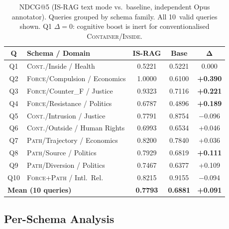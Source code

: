 \documentclass[11pt,a4paper]{article}
\begin{document}
\begin{table}[h]
\centering
\small
\setlength{\tabcolsep}{4pt}
\begin{tabular}{clccc}
\toprule
\textbf{Q} & \textbf{Schema / Domain} & \textbf{IS-RAG} & \textbf{Base} & $\boldsymbol{\Delta}$ \\
\midrule
Q1  & \textsc{Cont.}/Inside / Health           & 0.5221 & 0.5221 & 0.000 \\
Q2  & \textsc{Force}/Compulsion / Economics    & 1.0000 & 0.6100 & \textbf{+0.390} \\
Q3  & \textsc{Force}/Counter\_F / Justice      & 0.9323 & 0.7116 & \textbf{+0.221} \\
Q4  & \textsc{Force}/Resistance / Politics     & 0.6787 & 0.4896 & \textbf{+0.189} \\
\midrule
Q5  & \textsc{Cont.}/Intrusion / Justice       & 0.7791 & 0.8754 & $-$0.096 \\
Q6  & \textsc{Cont.}/Outside / Human Rights    & 0.6993 & 0.6534 & +0.046 \\
\midrule
Q7  & \textsc{Path}/Trajectory / Economics     & 0.8200 & 0.7840 & +0.036 \\
Q8  & \textsc{Path}/Source / Politics          & 0.7929 & 0.6819 & \textbf{+0.111} \\
Q9  & \textsc{Path}/Diversion / Politics       & 0.7467 & 0.6377 & +0.109 \\
\midrule
Q10 & \textsc{Force+Path} / Intl.\ Rel.        & 0.8215 & 0.9155 & $-$0.094 \\
\midrule
\multicolumn{2}{l}{\textbf{Mean (10 queries)}} & \textbf{0.7793} & \textbf{0.6881} & \textbf{+0.091} \\
\bottomrule
\end{tabular}
\caption{NDCG@5 (IS-RAG text mode vs.\ baseline, independent Opus annotator).
  Queries grouped by schema family. All 10~valid queries shown.
  Q1 $\Delta{=}0$: cognitive boost is inert for conventionalised
  \textsc{Container}/\textsc{Inside}.}
\label{tab:perquery}
\end{table}


\subsection{Per-Schema Analysis}
\end{document}
